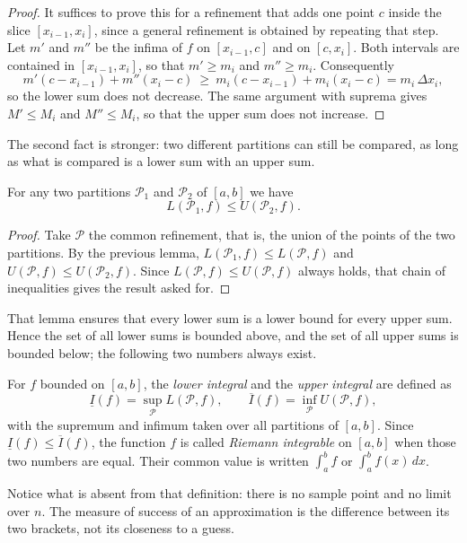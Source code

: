 \begin{proof}
It suffices to prove this for a refinement that adds one point $c$ inside the slice
$[x_{i-1},x_i]$, since a general refinement is obtained by repeating that step.
Let $m'$ and $m''$ be the infima of $f$ on $[x_{i-1},c]$ and on $[c,x_i]$. Both
intervals are contained in $[x_{i-1},x_i]$, so that $m'\ge m_i$ and $m''\ge m_i$.
Consequently
\[
m'(c-x_{i-1})+m''(x_i-c)\ \ge\ m_i(c-x_{i-1})+m_i(x_i-c)=m_i\,\Delta x_i ,
\]
so the lower sum does not decrease. The same argument with suprema gives $M'\le M_i$
and $M''\le M_i$, so that the upper sum does not increase.
\end{proof}

The second fact is stronger: two different partitions can still be compared, as long as what
is compared is a lower sum with an upper sum.

\begin{lemma}
For any two partitions $\mathcal{P}_1$ and $\mathcal{P}_2$ of $[a,b]$ we have
\[
L(\mathcal{P}_1,f)\le U(\mathcal{P}_2,f).
\]
\end{lemma}

\begin{proof}
Take $\mathcal{P}$ the common refinement, that is, the union of the points of the two partitions. By
the previous lemma, $L(\mathcal{P}_1,f)\le L(\mathcal{P},f)$ and
$U(\mathcal{P},f)\le U(\mathcal{P}_2,f)$. Since $L(\mathcal{P},f)\le U(\mathcal{P},f)$
always holds, that chain of inequalities gives the result asked for.
\end{proof}

That lemma ensures that every lower sum is a lower bound for every upper
sum. Hence the set of all lower sums is bounded above, and the set of all upper sums
is bounded below; the following two numbers always exist.

\begin{definisi}
For $f$ bounded on $[a,b]$, the \emph{lower integral} and the \emph{upper integral}
are defined as
\[
\underline{I}(f)=\sup_{\mathcal{P}}L(\mathcal{P},f),
\qquad
\overline{I}(f)=\inf_{\mathcal{P}}U(\mathcal{P},f),
\]
with the supremum and infimum taken over all partitions of $[a,b]$. Since
$\underline{I}(f)\le\overline{I}(f)$, the function $f$ is called \emph{Riemann integrable}
on $[a,b]$ when those two numbers are equal. Their common value is written
$\int_a^b f$ or $\int_a^b f(x)\,dx$.
\end{definisi}

Notice what is absent from that definition: there is no sample point and no
limit over $n$. The measure of success of an approximation is the difference between its two brackets,
not its closeness to a guess.

